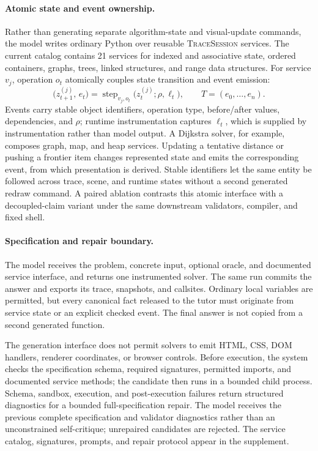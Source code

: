 \documentclass[letterpaper]{article}
\begin{document}
\paragraph{Atomic state and event ownership.}
Rather than generating separate algorithm-state and visual-update
commands, the model writes ordinary Python over reusable
\textsc{TraceSession} services. The current catalog contains 21
services for indexed and associative state, ordered containers, graphs,
trees, linked structures, and range data structures. For service
\(v_j\), operation \(o_t\) atomically couples state transition and
event emission:
\[
\bigl(z_{t+1}^{(j)},\,e_t\bigr)
=
\operatorname{step}_{v_j,o_t}
\bigl(z_t^{(j)};\rho,\ell_t\bigr),
\qquad
T=(e_0,\ldots,e_n).
\label{eq:service_step}
\]
Events carry stable object identifiers, operation type, before/after
values, dependencies, and \(\rho\); runtime instrumentation captures
\(\ell_t\), which is supplied by instrumentation rather than model
output. A Dijkstra solver, for
example, composes graph, map, and heap services. Updating a tentative
distance or pushing a frontier item changes represented state and emits
the corresponding event, from which presentation is derived. Stable
identifiers let the same entity be followed across trace, scene, and
runtime states without a second generated redraw command.
A paired ablation contrasts this atomic interface with a
decoupled-claim variant under the same downstream validators, compiler,
and fixed shell.

\paragraph{Specification and repair boundary.}
The model receives the problem, concrete input, optional oracle, and
documented service interface, and returns one instrumented solver. The
same run commits the answer and exports its trace, snapshots, and
callsites. Ordinary local variables are permitted, but every canonical
fact released to the tutor must originate from service state or an
explicit checked event. The final answer is not copied from a second
generated function.

The generation interface does not permit solvers to emit HTML, CSS, DOM
handlers, renderer coordinates, or browser controls. Before execution,
the system checks
the specification schema, required signatures, permitted imports, and
documented service methods; the candidate then runs in a bounded child
process. Schema, sandbox, execution, and post-execution failures return
structured diagnostics for a bounded full-specification repair. The
model receives the previous complete specification and validator
diagnostics rather than an unconstrained self-critique; unrepaired
candidates are rejected. The service catalog, signatures, prompts, and
repair protocol appear in the supplement.
\end{document}
